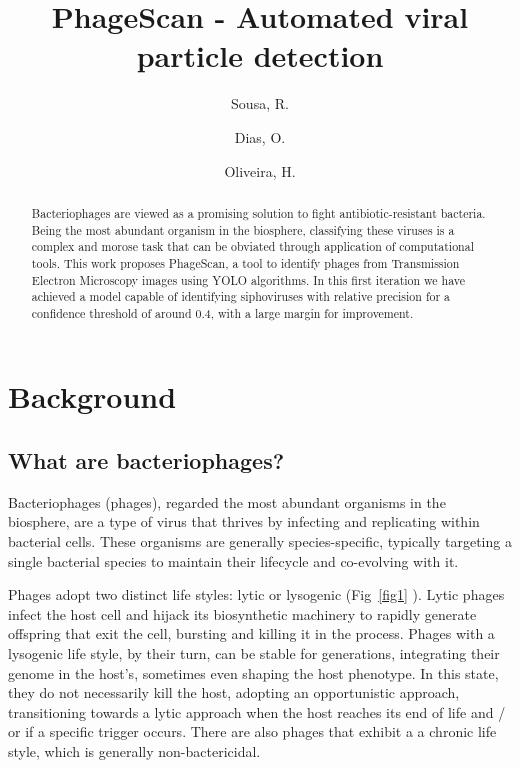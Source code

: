 \documentclass[runningheads]{llncs}
\begin{document}
%
\title{PhageScan - Automated viral particle detection}
%
%
\author{Sousa, R. \and
Dias, O. \and
Oliveira, H.}
%
%
%
\maketitle              %
%
\begin{abstract} 

Bacteriophages are viewed as a promising solution to fight antibiotic-resistant bacteria. Being the most abundant organism in the biosphere, classifying these viruses is a complex and morose task that can be obviated through application of computational tools. This work proposes PhageScan, a tool to identify phages from Transmission Electron Microscopy images using YOLO algorithms. In this first iteration we have achieved a model capable of identifying siphoviruses with relative precision for a confidence threshold of around 0.4, with a large margin for improvement.

\end{abstract}
%
%
%
\section{Background}
%
%
\subsection{
What are bacteriophages?}

Bacteriophages (phages), regarded the most abundant organisms in the biosphere, are a type of virus that thrives by infecting and replicating within bacterial cells. \cite{batinovic2019} These organisms are generally species-specific, typically targeting a single bacterial species to maintain their lifecycle and co-evolving with it. \cite{clokie2011,kasman2022,koskella2014,suttle2005}
%
%

Phages adopt two distinct life styles: lytic or lysogenic (Fig~\ref{fig1} \cite{varona2017}). Lytic phages infect the host cell and hijack its biosynthetic machinery to rapidly generate offspring that exit the cell, bursting and killing it in the process. Phages with a lysogenic life style, by their turn, can be stable for generations, integrating their genome in the host's, sometimes even shaping the host phenotype. In this state, they do not necessarily kill the host, adopting an opportunistic approach, transitioning towards a lytic approach when the host reaches its end of life and / or if a specific trigger occurs. There are also phages that exhibit a a chronic life style, which is generally non-bactericidal. \cite{clokie2011,varona2017,ioannou2023}
\end{document}

